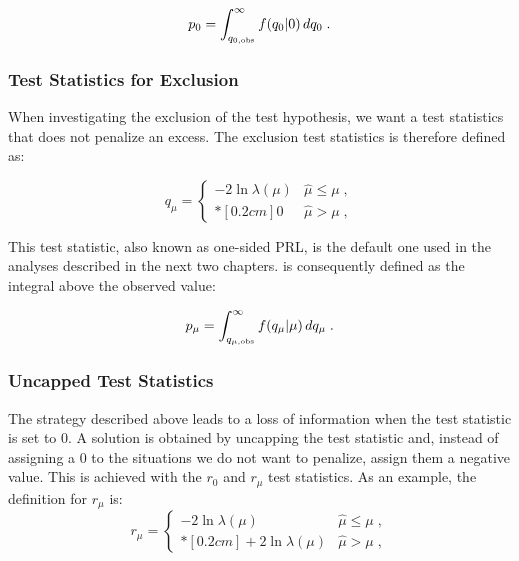 \begin{equation}
\label{eq:stat:p0}
p_{0} = \int_{q_{0,{\rm obs}}}^{\infty} f(q_{0} | 0 ) \, d q_{0} \;.
\end{equation}

\subsubsection*{Test Statistics for Exclusion}

When investigating the exclusion of the test hypothesis, we want a test statistics that does not penalize an excess. The exclusion test statistics \qmu is therefore defined as:

\begin{equation}
\label{eq:stat:qmu}
q_{\mu} =
\left\{ \! \! \begin{array}{ll}
               - 2 \ln \lambda(\mu)  & \hat{\mu} \le \mu  \;, \\*[0.2 cm]
               0 & \hat{\mu} > \mu \;,
              \end{array}
       \right.
\end{equation}

\noindent This test statistic, also known as one-sided PRL, is the default one used in the analyses described in the next two chapters. \pmu is consequently defined as the integral above the observed value: 

\begin{equation}
\label{eq:stat:pmu}
p_{\mu} = \int_{q_{\mu,{\rm obs}}}^{\infty} f(q_{\mu} | \mu ) \, d q_{\mu} \;.
\end{equation}


\subsubsection*{Uncapped Test Statistics}

The strategy described above leads to a loss of information when the test statistic is set to 0. A solution is obtained by uncapping the test statistic and, instead of assigning a 0 to the situations we do not want to penalize, assign them a negative value. This is achieved with the $r_0$ and $r_\mu$ test statistics. As an example, the definition for $r_\mu$ is:
\begin{equation}
\label{eq:rmu}
r_{\mu} =
\left\{ \! \! \begin{array}{ll}
               - 2 \ln \lambda(\mu)  & \hat{\mu} \le \mu  \;, \\*[0.2 cm]
               + 2 \ln \lambda(\mu)  & \hat{\mu} > \mu  \;,
              \end{array}
       \right.
\end{equation}

